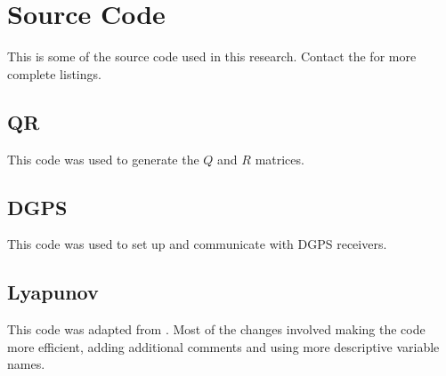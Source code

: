 \chapter{Source Code}
\label{ch:code}
This is some of the source code used in this research. Contact the  for more complete listings.

\section{QR}
\label{sec:qrcode}
This code was used to generate the $Q$ and $R$ matrices.
\lstset{language=C++}

\clearpage
\section{DGPS}
\label{sec:dgpscode}
This code was used to set up and communicate with DGPS receivers.

\clearpage
\section{Lyapunov}
\label{sec:lyapunovcode}
This code was adapted from \cite{Rusu05RobotuxLyapunov}. Most of the changes involved making the code more efficient,  adding additional comments and using more descriptive variable names.
\lstset{language=Matlab}

